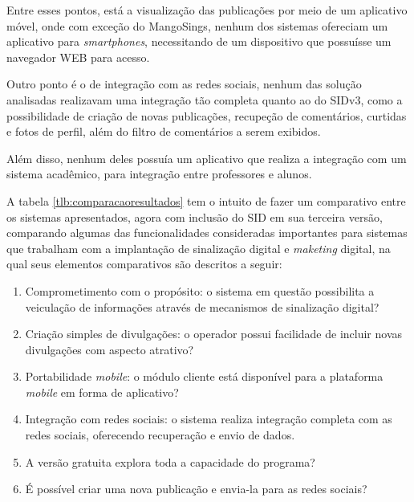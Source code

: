 Entre esses pontos, está a visualização das publicações por meio de um aplicativo móvel, onde com exceção do MangoSings, nenhum dos sistemas ofereciam um aplicativo para \textit{smartphones}, necessitando de um dispositivo que possuísse um navegador WEB para acesso.

Outro ponto é o de integração com as redes sociais, nenhum das solução analisadas realizavam uma integração tão completa quanto ao do SIDv3, como a possibilidade de criação de novas publicações, recupeção de comentários, curtidas e fotos de perfil, além do filtro de comentários a serem exibidos. 

Além disso, nenhum deles possuía um aplicativo que realiza a integração com um sistema acadêmico, para integração entre professores e alunos.

A tabela \ref{tlb:comparacaoresultados} tem o intuito de fazer um comparativo entre os sistemas apresentados, agora com inclusão do SID em sua terceira versão, comparando algumas das funcionalidades consideradas importantes para sistemas que trabalham com a implantação de sinalização digital e \textit{maketing} digital, na qual seus elementos comparativos são descritos a seguir:

\begin{enumerate}[label=\Roman*)]
\label{tlb:comparacaoresultados}
	\item Comprometimento com o propósito: o sistema em questão possibilita a veiculação de informações através de mecanismos de sinalização digital?
	\item Criação simples de divulgações: o operador possui facilidade de incluir novas divulgações com aspecto atrativo?
	\item Portabilidade \textit{mobile}: o módulo cliente está disponível para a plataforma \textit{mobile} em forma de aplicativo?
	\item Integração com redes sociais: o sistema realiza integração completa com as redes sociais, oferecendo recuperação e envio de dados.
	\item A versão gratuita explora toda a capacidade do programa?
	\item É possível criar uma nova publicação e envia-la para as redes sociais?
\end{enumerate}

